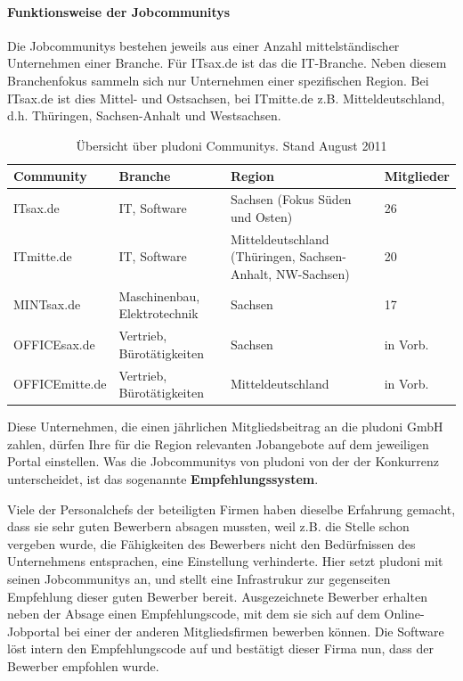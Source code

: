 \paragraph{Funktionsweise der Jobcommunitys}
Die Jobcommunitys bestehen jeweils aus einer Anzahl mittelständischer Unternehmen einer Branche. Für ITsax.de ist das die IT-Branche. Neben diesem Branchenfokus sammeln sich nur Unternehmen einer spezifischen Region. Bei ITsax.de ist dies Mittel- und Ostsachsen, bei ITmitte.de z.B. Mitteldeutschland, d.h. Thüringen, Sachsen-Anhalt und Westsachsen. 
\begin{table}[htbp]
\label{tb:dt}
\caption{Übersicht über pludoni Communitys. Stand August 2011}
\begin{tabular}{|l|p{2.8cm}|p{5cm}|l|}
\hline
\rowcolor{Gray}
Community & Branche & Region & Mitglieder \\\hline
ITsax.de & IT, Software &  Sachsen (Fokus Süden und Osten) & 26\\\hline
ITmitte.de & IT, Software &  Mitteldeutschland (Thüringen, Sachsen-Anhalt, NW-Sachsen) & 20 \\\hline
MINTsax.de & Maschinenbau, Elektrotechnik &  Sachsen & 17\\\hline
OFFICEsax.de & Vertrieb, Bürotätigkeiten &  Sachsen & in Vorb.\\\hline
OFFICEmitte.de & Vertrieb, Bürotätigkeiten &  Mitteldeutschland & in Vorb.\\\hline
\end{tabular}
\end{table}

Diese Unternehmen, die einen jährlichen Mitgliedsbeitrag an die pludoni GmbH zahlen, dürfen Ihre für die Region relevanten Jobangebote auf dem jeweiligen Portal einstellen. Was die Jobcommunitys von pludoni von der der Konkurrenz unterscheidet, ist das sogenannte \textbf{Empfehlungssystem}. 

Viele der Personalchefs der beteiligten Firmen haben dieselbe Erfahrung gemacht, dass sie sehr guten Bewerbern absagen mussten, weil z.B. die Stelle schon vergeben wurde, die Fähigkeiten des Bewerbers nicht den Bedürfnissen des Unternehmens entsprachen, eine Einstellung verhinderte. Hier setzt pludoni mit seinen Jobcommunitys an, und stellt eine Infrastrukur zur gegenseiten Empfehlung dieser guten Bewerber bereit.  Ausgezeichnete Bewerber erhalten neben der Absage einen Empfehlungscode, mit dem sie sich auf dem Online-Jobportal bei einer der anderen Mitgliedsfirmen bewerben können. Die Software löst intern den Empfehlungscode auf und bestätigt dieser Firma nun, dass der Bewerber empfohlen wurde. 

